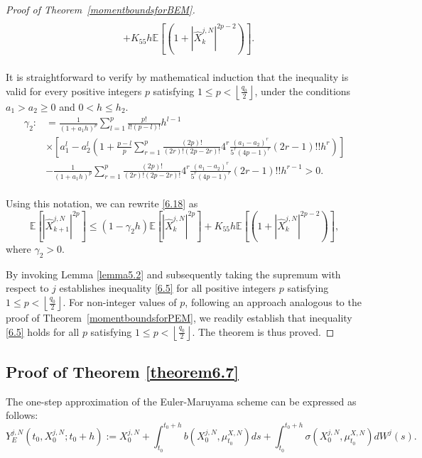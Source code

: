 \documentclass[12pt]{article}
\numberwithin{equation}{section}
\begin{document}
\begin{proof}[Proof of Theorem~\ref{momentboundsforBEM}]
\begin{equation}
\begin{aligned}
\\
&+K_{55}h \mathbb{E} \left[\left( 1+\left|\hat{X}_{k}^{j,N}\right|^{2p-2} \right)\right].
\end{aligned}
\end{equation}\\
It is straightforward to verify by mathematical induction that the inequality is valid for every positive integers $p$ satisfying $1 \leq p < \left\lfloor \frac{q_0}{2} \right\rfloor$, under the conditions $a_1 > a_2 \geq 0$ and $0 < h \leq h_2$.
\begin{equation}\tag{5.122}\label{6.19}
\begin{aligned}
\gamma_{2}:&=\tfrac{1}{\left( 1+a_1h \right) ^p}\sum_{l=1}^{p}{\tfrac{p!}{l!\left( p-l \right) !}h^{l-1}}\\
&\times\left[ a_{1}^{l}-a_{2}^{l}\left( 1+\tfrac{p-l}{p}\sum_{r=1}^p{\tfrac{\left( 2p \right) !}{\left( 2r \right) !\left( 2p-2r \right) !}4^r\tfrac{\left( a_1-a_2 \right) ^r}{5^r\left( 4p-1 \right) ^r}\left( 2r-1 \right) !!h^r} \right) \right]\\
&-\tfrac{1}{\left( 1+a_1h \right) ^p}\sum_{r=1}^p{\tfrac{\left( 2p \right) !}{\left( 2r \right) !\left( 2p-2r \right) !}4^r\tfrac{\left( a_1-a_2 \right) ^r}{5^r\left( 4p-1 \right) ^r}\left( 2r-1 \right) !!h^{r-1}}>0.
\end{aligned}
\end{equation}\\
Using this notation, we can rewrite \eqref{6.18} as 
\begin{equation}\tag{5.123}\label{6.20}
\mathbb{E} \left[ \left| \hat{X}_{k+1}^{j,N} \right|^{2p} \right] \le \left(1-\gamma_{2} h\right)\mathbb{E} \left[ \left| \hat{X}_{k}^{j,N} \right|^{2p} \right] +K_{55}h\mathbb{E} \left[ \left( 1+\left| \hat{X}_{k}^{j,N} \right|^{2p-2} \right) \right], 
\end{equation}
where $\gamma_{2}>0$.

By invoking Lemma \ref{lemma5.2} and subsequently taking the supremum with respect to $j$ establishes inequality \eqref{6.5} for all positive integers $p$ satisfying $1 \leq p < \left\lfloor \frac{q_0}{2} \right\rfloor$.  
For non-integer values of $p$, following an approach analogous to the proof of Theorem~\ref{momentboundsforPEM}, we readily establish that inequality \eqref{6.5} holds for all $p$ satisfying $1 \leq p < \left\lfloor \frac{q_0}{2} \right\rfloor$. 
The theorem is thus proved.
\end{proof} 
\subsection{Proof of Theorem \ref{theorem6.7}}
The one-step approximation of the Euler-Maruyama scheme can be expressed as follows:
\begin{equation}\tag{5.124}\label{6.21}
Y^{j,N}_{E}\left( t_{0},X^{j,N}_{0};t_{0}+h \right) :=X^{j,N}_{0}+\int_{t_{0}}^{t_{0}+h}{b\left( X^{j,N}_{0},\mu _{t_{0}}^{X,N} \right)}ds+\int_{t_{0}}^{t_{0}+h}{\sigma \left( X^{j,N}_{0},\mu _{t_{0}}^{X,N} \right)}dW^j\left( s \right).
\end{equation}
\end{document}
